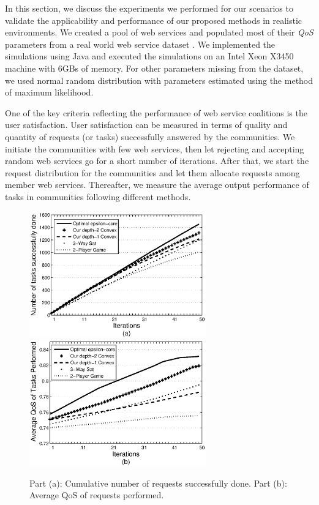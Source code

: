 \documentclass[10pt,journal,cspaper,compsoc]{IEEEtran}
\begin{document}
In this section, we discuss the experiments we performed for our
scenarios to validate the applicability and performance of our
proposed methods in realistic environments. We created a pool of
web services and populated most of their \emph{QoS} parameters
from a real world web service dataset
\cite{DBLP:conf/smc/Al-MasriM09a}. We implemented the simulations
using Java and executed the simulations on an Intel Xeon X3450
machine with 6GBs of memory. For other parameters missing from the
dataset, we used normal random distribution with parameters
estimated using the method of maximum likelihood.

One of the key criteria reflecting the performance of web service
coalitions is the user satisfaction. User satisfaction can be
measured in terms of quality and quantity of requests (or tasks)
successfully answered by the communities. We initiate the
communities with few web services, then let rejecting and
accepting random web services go for a short number of iterations.
After that, we start the request distribution for the communities
and let them allocate requests among member web services.
Thereafter, we measure the average output performance of tasks in
communities following different methods.

\begin{figure}[!t]
\centering
\includegraphics[width=3in]{task_done_opt.eps}
\includegraphics[width=3in]{task_qos_opt.eps}
\caption{Part (a): Cumulative number of requests successfully
done. Part (b): Average QoS of requests performed.}
\label{performanceall}
\end{figure}
\end{document}
